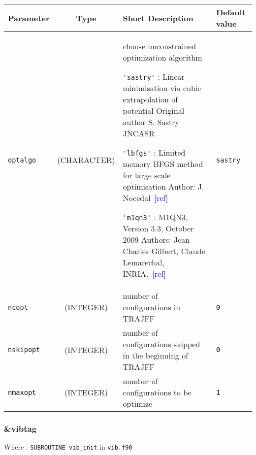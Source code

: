 \documentclass[a4paper]{article}
\newcommand{\addref}{\textcolor{blue}{[ref]}}
\begin{document}
\begin{longtable}{l|c|m{8cm}|m{2cm}}
\hline
\hline
Parameter        &  Type              &          Short Description                                                          & Default value \\
\hline
\hline
\rule[-0.75cm]{0cm}{1.5cm}
\verb?optalgo?   & (CHARACTER)        & \newline choose unconstrained optimization algorithm \newline 

                                        \verb?'sastry'? : Linear minimisation via cubic extrapolation of potential 
					Original author S. Sastry JNCASR \newline

					\verb?'lbfgs'? : Limited memory BFGS method for large scale optimisation
					Author: J. Nocedal~\addref  \newline 
					 
					\verb?'m1qn3'? : M1QN3, Version 3.3, October 2009
					Authors: Jean Charles Gilbert, Claude Lemarechal, INRIA.~\addref \newline            & \verb?sastry? \tabularnewline
\hline
\rule[-0.75cm]{0cm}{1.5cm}
\verb?ncopt?     & (INTEGER)          & number of configurations in TRAJFF                                                   & \verb?0? \\
\hline
\rule[-0.75cm]{0cm}{1.5cm}
\verb?nskipopt?  & (INTEGER)          & number of configurations skipped in the beginning of TRAJFF                          & \verb?0? \\
\hline
\rule[-0.75cm]{0cm}{1.5cm}
\verb?nmaxopt?   & (INTEGER)          & number of configurations to be optimize                                              & \verb?1? \\
\hline
\hline
\end{longtable}

\subsubsection{\&vibtag}

Where : \verb?SUBROUTINE vib_init? in \verb?vib.f90?
\newline
\end{document}
